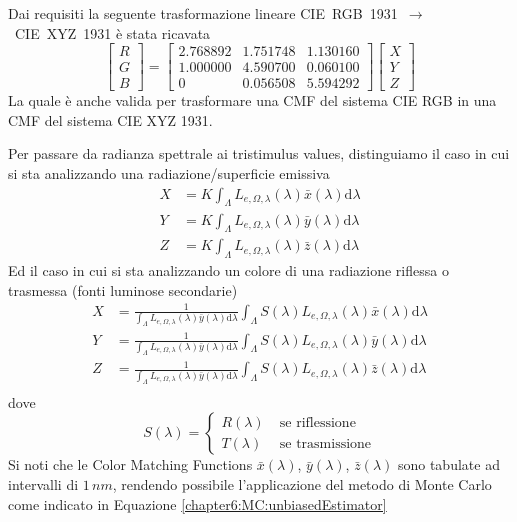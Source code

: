 Dai requisiti la seguente trasformazione lineare \mbox{CIE RGB 1931 $\rightarrow$ CIE XYZ 1931} \`e stata ricavata
\begin{equation}\label{chapter2:colorimetry:RGB2XYZ}
	\begin{bmatrix}
		R \\ G \\ B
	\end{bmatrix}
	=
	\begin{bmatrix}
		2.768892 & 1.751748 & 1.130160 \\
		1.000000 & 4.590700 & 0.060100 \\
		0 & 0.056508 & 5.594292
	\end{bmatrix}
	\begin{bmatrix}
		X \\ Y \\ Z
	\end{bmatrix}
\end{equation}
La quale \`e anche valida per trasformare una CMF del sistema CIE RGB in una CMF del sistema CIE XYZ 1931.\par
Per passare da radianza spettrale ai tristimulus values, distinguiamo il caso in cui si sta analizzando una radiazione/superficie emissiva
\begin{align}\label{chapter2:colorimetry:spectrum2XYZ4Source}
	X &= K\int_\Lambda L_{e,\Omega,\lambda}(\lambda)\bar{x}(\lambda)\mathrm{d}\lambda\\
	Y &= K\int_\Lambda L_{e,\Omega,\lambda}(\lambda)\bar{y}(\lambda)\mathrm{d}\lambda\\
	Z &= K\int_\Lambda L_{e,\Omega,\lambda}(\lambda)\bar{z}(\lambda)\mathrm{d}\lambda
\end{align}
Ed il caso in cui si sta analizzando un colore di una radiazione riflessa o trasmessa (fonti luminose secondarie)
\begin{align}
	X &= \frac{1}{\int_\Lambda L_{e,\Omega,\lambda}(\lambda)\bar{y}(\lambda)\mathrm{d}\lambda}
		\int_\Lambda S(\lambda)L_{e,\Omega,\lambda}(\lambda)\bar{x}(\lambda)\mathrm{d}\lambda\\
	Y &= \frac{1}{\int_\Lambda L_{e,\Omega,\lambda}(\lambda)\bar{y}(\lambda)\mathrm{d}\lambda}
		\int_\Lambda S(\lambda)L_{e,\Omega,\lambda}(\lambda)\bar{y}(\lambda)\mathrm{d}\lambda\\
	Z &= \frac{1}{\int_\Lambda L_{e,\Omega,\lambda}(\lambda)\bar{y}(\lambda)\mathrm{d}\lambda}
		\int_\Lambda S(\lambda)L_{e,\Omega,\lambda}(\lambda)\bar{z}(\lambda)\mathrm{d}\lambda\\
\end{align}
dove
\begin{equation}\label{chapter2:colorimetry:spectrum2XYZ4Rad}
	S(\lambda) = \left\{ \begin{aligned}
		R(\lambda)\;&\text{se riflessione}\\
		T(\lambda)\;&\text{se trasmissione}
	\end{aligned}\right.
\end{equation}
Si noti che le Color Matching Functions $\bar{x}(\lambda)$, $\bar{y}(\lambda)$, $\bar{z}(\lambda)$ sono tabulate ad intervalli di $1\,\si{nm}$, 
rendendo possibile l'applicazione del metodo di Monte Carlo come indicato in Equazione \ref{chapter6:MC:unbiasedEstimator}
